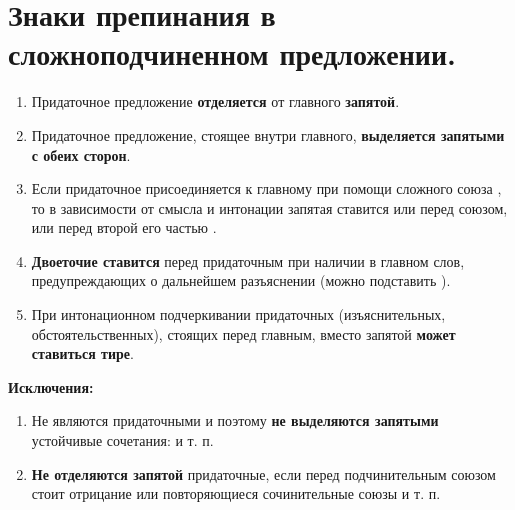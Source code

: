 \documentclass[main]{subfile}
\begin{document}
\section{Знаки препинания в сложноподчиненном предложении.}

\begin{enumerate}
    \item Придаточное предложение \textbf{отделяется} от главного \textbf{запятой}. \newline
    \item Придаточное предложение, стоящее внутри главного, \textbf{выделяется запятыми с обеих сторон}. \newline
    \item Если придаточное присоединяется к главному при помощи сложного союза , то в зависимости от смысла и интонации запятая ставится или перед союзом, или перед второй его частью . \newline
    \item \textbf{Двоеточие ставится} перед придаточным при наличии в главном слов, предупреждающих о дальнейшем разъяснении (можно подставить ). \newline
    \item При интонационном подчеркивании придаточных (изъяснительных, обстоятельственных), стоящих перед главным, вместо запятой \textbf{может ставиться тире}. \newline
\end{enumerate}

\textbf{Исключения:}
\begin{enumerate}
    \item Не являются придаточными и поэтому \textbf{не выделяются запятыми} устойчивые сочетания:  и т. п. \newline
    \item \textbf{Не отделяются запятой} придаточные, если перед подчинительным союзом стоит отрицание  или повторяющиеся сочинительные союзы  и т. п. \newline
\end{enumerate}
\end{document}
